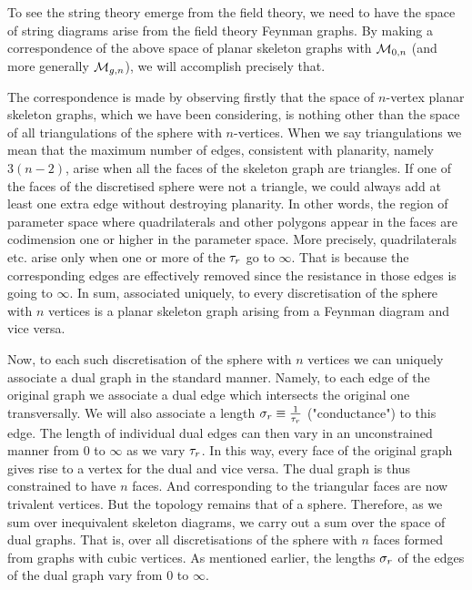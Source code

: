 

To see the string theory emerge from the field theory, we need to
have the space of string diagrams arise from the field theory
Feynman graphs. By making a correspondence of the above space of
planar skeleton graphs with ${\cal M}_{0,n}$ (and more generally
${\cal M}_{g,n}$), we will accomplish precisely that.

The correspondence is made by observing firstly that the space of
$n$-vertex planar skeleton graphs, which we have been considering, is
nothing other than the space of all triangulations of the sphere
with $n$-vertices. When we say triangulations we mean that the
maximum number of edges, consistent with planarity, namely
$3(n-2)$, arise when all the faces of the skeleton graph are
triangles. If one of the faces of the discretised sphere were not
a triangle, we could always add at least one extra edge without
destroying planarity. In other words, the region of parameter
space where quadrilaterals  and other polygons appear in the faces
are codimension one or higher in the parameter space. More
precisely, quadrilaterals etc. arise only when one or more of the
${\tau}_r$ go to $\infty$. That is because the corresponding edges are
effectively removed since the resistance in those edges is going
to $\infty$.  In sum, associated uniquely, to every discretisation
of the sphere with $n$ vertices is  a planar skeleton graph
arising from a Feynman diagram and vice versa.

Now, to each such discretisation of the sphere with $n$ vertices
we can uniquely associate a dual graph in the standard manner. Namely, to each edge of the original graph we associate
a dual edge which intersects the original one transversally. We
will also associate a length ${\sigma}_r\equiv {1\over {\tau}_r}$
("conductance") to this edge. The length of individual dual edges
can then vary in an unconstrained manner from $0$ to $\infty$ as
we vary ${\tau}_r$. In this way, every face of the original graph
gives rise to a vertex for the dual and vice versa. The dual graph
is thus constrained to have $n$ faces. And corresponding to the
triangular faces are now trivalent vertices. But the topology
remains that of a sphere. Therefore, as we sum over inequivalent
skeleton diagrams, we carry out a sum over the space of dual
graphs.
That is, over all discretisations of the sphere with $n$
faces formed from graphs with cubic vertices. As mentioned
earlier, the lengths ${\sigma}_r$ of the edges of the dual graph
vary from $0$ to $\infty$.

